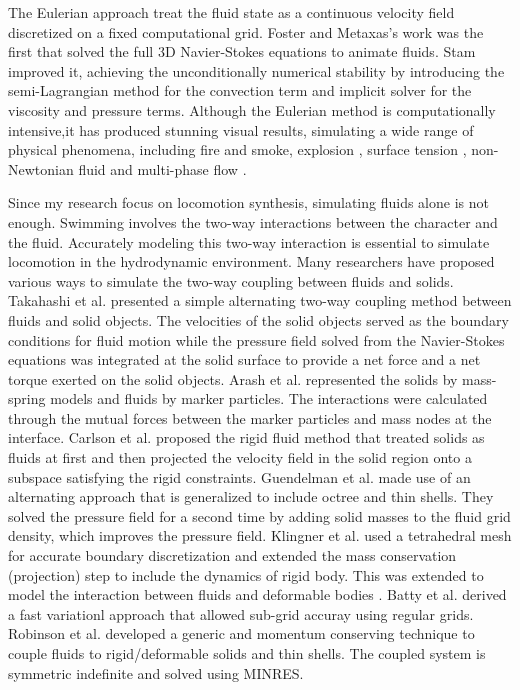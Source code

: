 The Eulerian approach treat the fluid state as a continuous velocity field discretized
on a fixed computational grid. Foster and Metaxas's work \cite{} was the first that
solved the full 3D Navier-Stokes equations to animate fluids.
Stam \cite{} improved it, achieving the unconditionally
numerical stability by introducing the semi-Lagrangian
method for the convection term and implicit solver for
the viscosity and pressure terms. Although the Eulerian method is computationally intensive,it has produced stunning visual results, simulating a wide range of physical phenomena, including fire and smoke\cite{}, explosion \cite{}, surface tension \cite{}, non-Newtonian fluid \cite{} and multi-phase flow \cite{}.

Since my research focus on locomotion synthesis, simulating fluids alone is not enough. Swimming involves the two-way interactions between the character and the fluid. Accurately modeling this two-way interaction is essential to simulate locomotion in the hydrodynamic environment. Many researchers have proposed various ways to
simulate the two-way coupling between fluids and solids.  Takahashi et al. \cite{takahashi2002fluid-rigid}
presented a simple alternating two-way coupling method between fluids and
solid objects. The velocities of the solid
objects served as the boundary conditions for fluid motion while the
pressure field solved from the Navier-Stokes equations was integrated at the
solid surface to provide a net force and a net torque exerted on the solid
objects. Arash et al. \cite{arash2003simulatingfluid-solid} represented the solids by mass-spring models and fluids by marker particles.  The interactions were calculated through the mutual forces between the marker particles and mass nodes at the interface. Carlson et al. \cite{carlson2004rigid} proposed the rigid
fluid method that treated solids as fluids at first
and then projected the velocity field in the solid region onto a subspace
satisfying the rigid constraints. Guendelman et al. \cite{guendelman2005thin} made use of an
alternating approach that is generalized to include octree and thin
shells.  They solved the pressure field for a
second time by adding solid masses to the fluid grid density, which improves
the pressure field. Klingner et al. \cite{klingner2006mesh} used a tetrahedral mesh for accurate boundary discretization and extended the mass conservation (projection) step
to include the dynamics of rigid body. This was extended to model the interaction between fluids and deformable bodies \cite{chentanez2006simultaneous}. Batty et al. \cite{batty2007fast} derived a fast variationl approach that allowed sub-grid accuray using regular grids. Robinson et al. \cite{robinson2008two} developed a generic and momentum
conserving technique to couple fluids to rigid/deformable solids and thin
shells. The coupled system is symmetric indefinite and solved using MINRES.

